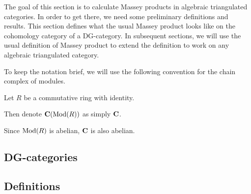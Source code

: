 The goal of this section is to calculate Massey products in algebraic triangulated categories. In order to get there, we need some preliminary definitions and results. This section defines what the usual Massey product looks like on the cohomology category of a DG-category. In subsequent sections, we will use the usual definition of Massey product to extend the definition to work on any algebraic triangulated category.

To keep the notation brief, we will use the following convention for the chain complex of modules.
\begin{notation}
    Let \( R \) be a commutative ring with identity.

    Then denote \( \operatorname{\mathbf{C}}(\operatorname{Mod}(R)) \) as simply \( \operatorname{\mathbf{C}} \).
\end{notation}

Since \( \operatorname{Mod}(R) \) is abelian, \( \operatorname{\mathbf{C}} \) is also abelian.

\subsection{DG-categories}


\subsection{Definitions}

